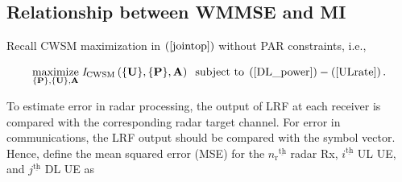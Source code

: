 \documentclass[9pt,journal]{IEEEtran}
\newcommand{\paren}[1]{\left({#1}\right)}
\newcommand{\braces}[1]{{\left\{ {#1}\right\}}}
\newcommand{\ith}[1]    {{#1}^{\underline{\text{th}}}}
\newcommand{\rr}{_\mathrm{r}}
\newcommand{\B}{\textrm{B}}
\theoremstyle{definition}
\begin{document}
\subsection{Relationship between WMMSE and MI}
\label{subsec: MMSE section}
Recall CWSM maximization in $\paren{\mathrm{\ref{jointop}}}$ without PAR constraints, i.e.,
\par\noindent\small
\begin{equation}\label{jointop_first}
\underset{{\braces{\mathbf{P}},\braces{\mathbf{U}},
\mathbf{A}}}{\text{maximize}}\; \mathit{I}_{\textrm{CWSM}}\paren{\braces{\mathbf{U}},\braces{\mathbf{P}},\mathbf{A}}\;\;\text{subject to}\; \paren{\mathrm{\ref{DL_power}}}-\paren{\mathrm{\ref{ULrate}}}.  
\end{equation}\normalsize

To estimate error in radar processing, the output of LRF at each receiver is compared with the corresponding radar target channel. For error in communications, the LRF output should be compared with the symbol vector. Hence, define the mean squared error (MSE) for the $\ith{n\rr}$ radar Rx, $\ith{i}$ UL UE, and $\ith{j}$ DL UE as \par\noindent\small
\iffalse
\end{document}
